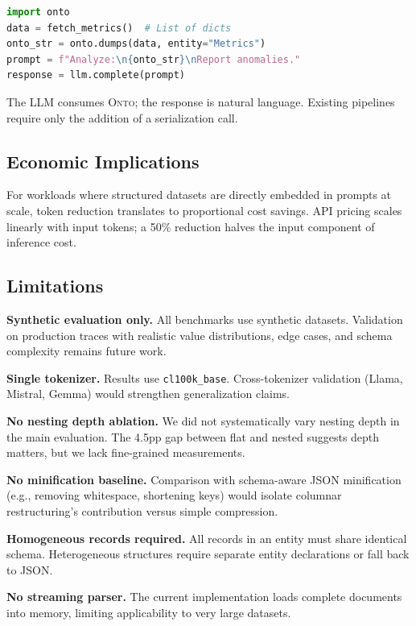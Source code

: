 \documentclass[10pt,twocolumn]{article}
\newcommand{\onto}{\textsc{Onto}\xspace}
\begin{document}
\begin{lstlisting}[style=onto,language=Python]
import onto
data = fetch_metrics()  # List of dicts
onto_str = onto.dumps(data, entity="Metrics")
prompt = f"Analyze:\n{onto_str}\nReport anomalies."
response = llm.complete(prompt)
\end{lstlisting}

The LLM consumes \onto; the response is natural language. Existing pipelines require only the addition of a serialization call.

\subsection{Economic Implications}

For workloads where structured datasets are directly embedded in prompts at scale, token reduction translates to proportional cost savings. API pricing scales linearly with input tokens; a 50\% reduction halves the input component of inference cost.

\subsection{Limitations}

\textbf{Synthetic evaluation only.} All benchmarks use synthetic datasets. Validation on production traces with realistic value distributions, edge cases, and schema complexity remains future work.

\textbf{Single tokenizer.} Results use \texttt{cl100k\_base}. Cross-tokenizer validation (Llama, Mistral, Gemma) would strengthen generalization claims.

\textbf{No nesting depth ablation.} We did not systematically vary nesting depth in the main evaluation. The 4.5pp gap between flat and nested suggests depth matters, but we lack fine-grained measurements.

\textbf{No minification baseline.} Comparison with schema-aware JSON minification (e.g., removing whitespace, shortening keys) would isolate columnar restructuring's contribution versus simple compression.

\textbf{Homogeneous records required.} All records in an entity must share identical schema. Heterogeneous structures require separate entity declarations or fall back to JSON.

\textbf{No streaming parser.} The current implementation loads complete documents into memory, limiting applicability to very large datasets.
\end{document}
